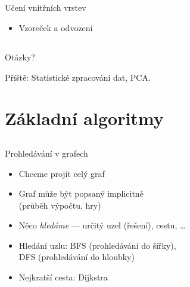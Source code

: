 \documentclass{beamer}
\begin{document}
\subsection{}
\begin{frame}{Učení vnitřních vrstev}
\begin{itemize}
\item Vzoreček a odvození
\end{itemize}
\end{frame}

\subsection{}
\begin{frame}{Otázky?}
\begin{center}
Příště: Statistické zpracování dat, PCA.
\end{center}
\end{frame}

\section{Základní algoritmy}

\subsection{}
\begin{frame}{Prohledávání v grafech}
\begin{itemize}
\item Chceme projít celý graf
\item Graf může být popsaný implicitně \\ (průběh výpočtu, hry)
\item Něco {\em hledáme} --- určitý uzel (řešení), cestu, \dots
\item Hledání uzlu: BFS (prohledávání do šířky), \\ DFS (prohledávání do hloubky)
\item Nejkratší cesta: Dijkstra
\end{itemize}
\end{frame}
\end{document}
